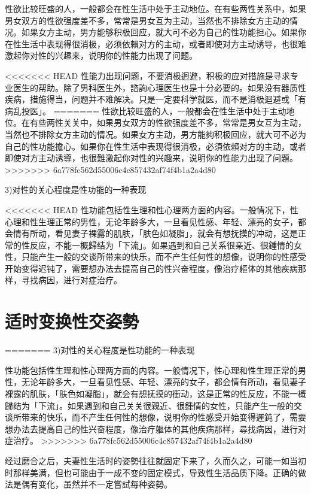 \documentclass[12pt,UTF8]{ctexbook}
\begin{document}
性欲比较旺盛的人，一般都会在性生活中处于主动地位。在有些两性关系中，如果男女双方的性欲强度差不多，常常是男女互为主动，当然也不排除女方主动的情况。如果女方主动，男方能够积极回应，就大可不必为自己的性功能担心。如果你在性生活中表现得很消极，必须依賴对方的主动，或者即使对方主动诱导，也很难激起你对性的兴趣来，说明你的性能力出现了问题。

<<<<<<< HEAD
性能力出现问题，不要消极迥避，积极的应对措施是寻求专业医生的帮助。除了男科医生外，諮詢心理医生也是十分必要的。如果没有器质性疾病，措施得当，问题并不难解决。只是一定要科学就医，而不是消极迴避或「有病乱投医」。
=======
性欲比较旺盛的人，一般都会在性生活中处于主动地位。在有些两性关关中，如果男女双方的性欲强度差不多，常常是男女互为主动，当然也不排除女方主动的情况。如果女方主动，男方能夠积极回应，就大可不必为自己的性功能擔心。如果你在性生活中表现得很消极，必須依賴对方的主动，或者即使对方主动诱導，也很難激起你对性的兴趣来，说明你的性能力出现了问題。
>>>>>>> 6a778fc562d55006c4c857432af74f4b1a2a4d80

3)对性的关心程度是性功能的一种表现

<<<<<<< HEAD
性功能包括性生理和性心理两方面的内容。一般情况下，性心理和性生理正常的男性，无论年龄多大，一旦看见性感、年轻、漂亮的女子，都会情有所动，看见妻子裸露的肌肤，「肤色如凝脂」，就会有想抚摸的冲动，这是正常的性反应，不能一概歸结为「下流」。如果遇到和自己关系很亲近、很鍾情的女性，只能产生一般的交谈所带来的快乐，而不产生任何性的想像，说明你的性感受开始变得迟钝了，需要想办法去提高自己的性兴奋程度，像治疗軀体的其他疾病那样，寻找病因，进行对症治疗。

\section{适时变换性交姿勢}
=======
3)对性的关心程度是性功能的一种表现

性功能包括性生理和性心理两方面的内容。一般情况下，性心理和性生理正常的男性，无论年龄多大，一旦看见性感、年轻、漂亮的女子，都会情有所动，看见妻子裸露的肌肤，「肤色如凝脂」，就会有想抚摸的衝动，这是正常的性反应，不能一概歸结为「下流」。如果遇到和自己关关很親近、很鍾情的女性，只能产生一般的交谈所带来的快乐，而不产生任何性的想像，说明你的性感受开始变得遲鈍了，需要想办法去提高自己的性兴奋程度，像治疗軀体的其他疾病那样，尋找病因，进行对症治疗。
>>>>>>> 6a778fc562d55006c4c857432af74f4b1a2a4d80

经过磨合之后，夫妻性生活时的姿勢往往就固定下来了，久而久之，可能一如当初时那样美满，但也可能由于一成不变的固定模式，导致性生活品质下降。正确的做法是偶有变化，虽然并不一定嘗試每种姿勢。
\end{document}
